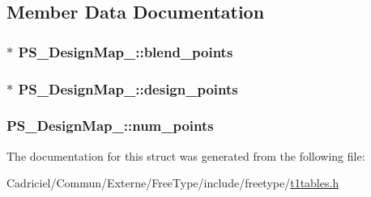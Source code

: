 \subsection{Member Data Documentation}
\hypertarget{struct_p_s___design_map___a74a555fb4315fca7477f6d20d49686ec}{
\subsubsection[{blend\-\_\-points}]{$\ast$ P\-S\-\_\-\-Design\-Map\-\_\-\-::blend\-\_\-points}}\label{struct_p_s___design_map___a74a555fb4315fca7477f6d20d49686ec}
\hypertarget{struct_p_s___design_map___abd7a86ba33248ceed657c31063b49679}{
\subsubsection[{design\-\_\-points}]{$\ast$ P\-S\-\_\-\-Design\-Map\-\_\-\-::design\-\_\-points}}\label{struct_p_s___design_map___abd7a86ba33248ceed657c31063b49679}
\hypertarget{struct_p_s___design_map___a505a70dd0f497f177fffca9bc4e5d0a5}{
\subsubsection[{num\-\_\-points}]{ P\-S\-\_\-\-Design\-Map\-\_\-\-::num\-\_\-points}}\label{struct_p_s___design_map___a505a70dd0f497f177fffca9bc4e5d0a5}


The documentation for this struct was generated from the following file\-:\begin{DoxyCompactItemize}
\item 
Cadriciel/\-Commun/\-Externe/\-Free\-Type/include/freetype/\hyperlink{t1tables_8h}{t1tables.\-h}\end{DoxyCompactItemize}
